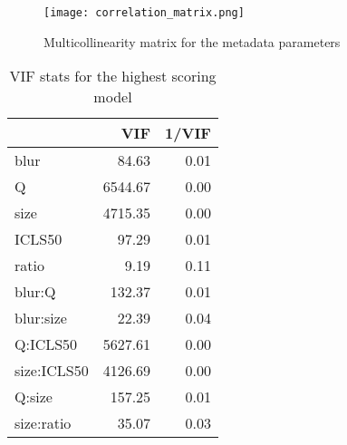 \documentclass[12pt]{article}
\begin{document}
\begin{sidewaysfigure}[h]
    \centering
	\begin{center}
		\texttt{[image: correlation\_matrix.png]}
	\end{center}
	\caption{Multicollinearity matrix for the metadata parameters}
	\label{fig:multicol}
\end{sidewaysfigure}

\begin{table}[h]
	\centering
	\caption{VIF stats for the highest scoring model}
	\begin{tabular}{lrr}
	  \toprule
	 & VIF & 1/VIF \\ 
	  \midrule
	blur & 84.63 & 0.01 \\ 
	  Q & 6544.67 & 0.00 \\ 
	  size & 4715.35 & 0.00 \\ 
	  ICLS50 & 97.29 & 0.01 \\ 
	  ratio & 9.19 & 0.11 \\ 
	  blur:Q & 132.37 & 0.01 \\ 
	  blur:size & 22.39 & 0.04 \\ 
	  Q:ICLS50 & 5627.61 & 0.00 \\ 
	  size:ICLS50 & 4126.69 & 0.00 \\ 
	  Q:size & 157.25 & 0.01 \\ 
	  size:ratio & 35.07 & 0.03 \\ 
	   \bottomrule
	\end{tabular}
	\label{tab:vif}
\end{table}
\end{document}
